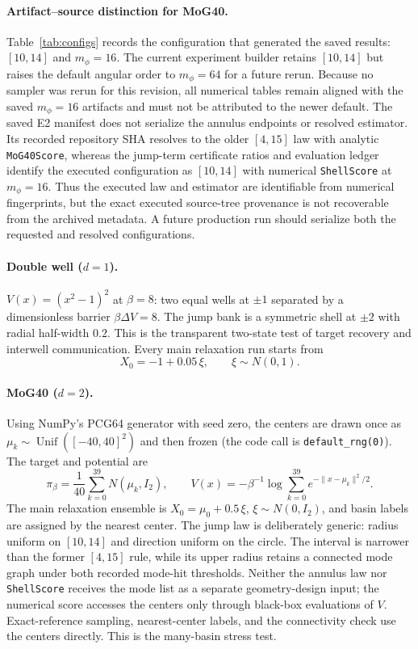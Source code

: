 \documentclass[11pt]{article}
\newcommand{\piB}{\pi_\beta}
\begin{document}
\paragraph{Artifact--source distinction for MoG40.}
Table~\ref{tab:configs} records the configuration that generated the saved
results: $[10,14]$ and $m_\phi=16$.  The current experiment builder retains
$[10,14]$ but raises the default angular order to $m_\phi=64$ for a future
rerun.  Because no sampler was rerun for this revision, all numerical tables
remain aligned with the saved $m_\phi=16$ artifacts and must not be attributed
to the newer default.  The saved E2 manifest does not serialize the annulus
endpoints or resolved estimator.  Its recorded repository SHA resolves to the
older $[4,15]$ law with analytic \texttt{MoG40Score}, whereas the jump-term
certificate ratios and evaluation ledger identify the executed configuration
as $[10,14]$ with numerical \texttt{ShellScore} at $m_\phi=16$.  Thus the
executed law and estimator are identifiable from numerical fingerprints, but
the exact executed source-tree provenance is not recoverable from the archived
metadata.  A future production run should serialize both the requested and
resolved configurations.

\paragraph{Double well ($d=1$).}
$V(x)=(x^2-1)^2$ at $\beta=8$: two equal wells at $\pm1$ separated by a
dimensionless barrier $\beta\Delta V=8$.  The jump bank is a symmetric shell
at $\pm2$ with radial half-width $0.2$.  This is the transparent two-state
test of target recovery and interwell communication.  Every main relaxation
run starts from
\begin{equation}
 X_0=-1+0.05\,\xi,\qquad \xi\sim N(0,1).
\end{equation}

\paragraph{MoG40 ($d=2$).}
Using NumPy's PCG64 generator with seed zero, the centers are drawn once as
$\mu_k\sim\operatorname{Unif}([-40,40]^2)$ and then frozen (the code call is
\texttt{default\_rng(0)}).  The target and potential are
\begin{equation}
 \piB=\frac1{40}\sum_{k=0}^{39}N(\mu_k,I_2),\qquad
 V(x)=-\beta^{-1}\log\sum_{k=0}^{39}
 e^{-\lVert x-\mu_k\rVert^2/2}.
\end{equation}
The main relaxation ensemble is
$X_0=\mu_0+0.5\,\xi$, $\xi\sim N(0,I_2)$, and basin labels are assigned by the
nearest center.  The jump law is deliberately generic: radius uniform on
$[10,14]$ and direction uniform on the circle.  The interval is narrower than
the former $[4,15]$ rule, while its upper radius retains a connected mode graph
under both recorded mode-hit thresholds.  Neither the annulus law nor
\texttt{ShellScore} receives the mode list as a separate geometry-design
input; the numerical score accesses the centers only through black-box
evaluations of $V$.  Exact-reference sampling, nearest-center labels, and the
connectivity check use the centers directly.  This is the many-basin stress
test.
\end{document}

